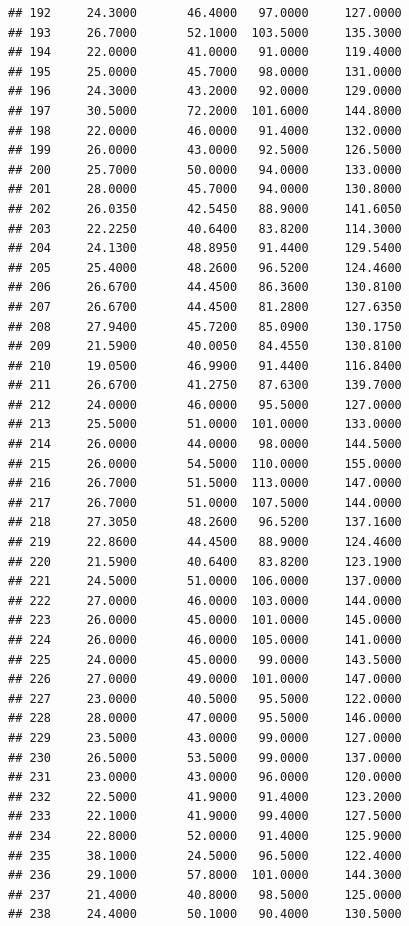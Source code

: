 \documentclass[]{article}
\begin{document}
\begin{verbatim}
## 192     24.3000       46.4000   97.0000     127.0000
## 193     26.7000       52.1000  103.5000     135.3000
## 194     22.0000       41.0000   91.0000     119.4000
## 195     25.0000       45.7000   98.0000     131.0000
## 196     24.3000       43.2000   92.0000     129.0000
## 197     30.5000       72.2000  101.6000     144.8000
## 198     22.0000       46.0000   91.4000     132.0000
## 199     26.0000       43.0000   92.5000     126.5000
## 200     25.7000       50.0000   94.0000     133.0000
## 201     28.0000       45.7000   94.0000     130.8000
## 202     26.0350       42.5450   88.9000     141.6050
## 203     22.2250       40.6400   83.8200     114.3000
## 204     24.1300       48.8950   91.4400     129.5400
## 205     25.4000       48.2600   96.5200     124.4600
## 206     26.6700       44.4500   86.3600     130.8100
## 207     26.6700       44.4500   81.2800     127.6350
## 208     27.9400       45.7200   85.0900     130.1750
## 209     21.5900       40.0050   84.4550     130.8100
## 210     19.0500       46.9900   91.4400     116.8400
## 211     26.6700       41.2750   87.6300     139.7000
## 212     24.0000       46.0000   95.5000     127.0000
## 213     25.5000       51.0000  101.0000     133.0000
## 214     26.0000       44.0000   98.0000     144.5000
## 215     26.0000       54.5000  110.0000     155.0000
## 216     26.7000       51.5000  113.0000     147.0000
## 217     26.7000       51.0000  107.5000     144.0000
## 218     27.3050       48.2600   96.5200     137.1600
## 219     22.8600       44.4500   88.9000     124.4600
## 220     21.5900       40.6400   83.8200     123.1900
## 221     24.5000       51.0000  106.0000     137.0000
## 222     27.0000       46.0000  103.0000     144.0000
## 223     26.0000       45.0000  101.0000     145.0000
## 224     26.0000       46.0000  105.0000     141.0000
## 225     24.0000       45.0000   99.0000     143.5000
## 226     27.0000       49.0000  101.0000     147.0000
## 227     23.0000       40.5000   95.5000     122.0000
## 228     28.0000       47.0000   95.5000     146.0000
## 229     23.5000       43.0000   99.0000     127.0000
## 230     26.5000       53.5000   99.0000     137.0000
## 231     23.0000       43.0000   96.0000     120.0000
## 232     22.5000       41.9000   91.4000     123.2000
## 233     22.1000       41.9000   99.4000     127.5000
## 234     22.8000       52.0000   91.4000     125.9000
## 235     38.1000       24.5000   96.5000     122.4000
## 236     29.1000       57.8000  101.0000     144.3000
## 237     21.4000       40.8000   98.5000     125.0000
## 238     24.4000       50.1000   90.4000     130.5000

\end{verbatim}
\end{document}
